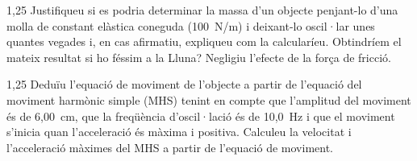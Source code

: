 \begin{apartat}{1,25}
Justifiqueu si es podria determinar la massa d'un objecte penjant-lo d'una molla de constant elàstica coneguda (100~N/m) i deixant-lo oscil·lar unes quantes vegades i, en cas afirmatiu, expliqueu com la calcularíeu. Obtindríem el mateix resultat si ho féssim a la Lluna? Negligiu l'efecte de la força de fricció.
\end{apartat}

\begin{apartat}{1,25}
Deduïu l'equació de moviment de l'objecte a partir de l'equació del moviment harmònic simple (MHS) tenint en compte que l'amplitud del moviment és de 6,00~cm, que la freqüència d'oscil·lació és de 10,0~Hz i que el moviment s'inicia quan l'acceleració és màxima i positiva. Calculeu la velocitat i l'acceleració màximes del MHS a partir de l'equació de moviment.
\end{apartat}
